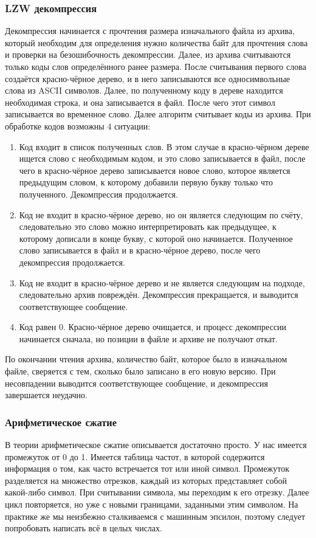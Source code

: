 \documentclass[12pt]{article}
\begin{document}
\subsubsection*{LZW декомпрессия}

Декомпрессия начинается с прочтения размера изначального файла из архива, который необходим для определения нужно количества байт для прочтения слова и проверки на безошибочность декомпрессии. Далее, из архива считываются только коды слов определённого ранее размера. После считывания первого слова создаётся красно-чёрное дерево, и в него записываются все односимвольные слова из ASCII символов. Далее, по полученному коду в дереве находится необходимая строка, и она записывается в файл. После чего этот символ записывается во временное слово. Далее алгоритм считывает коды из архива. При обработке кодов возможны 4 ситуации:

\begin{enumerate}
	\item Код входит в список полученных слов. В этом случае в красно-чёрном дереве ищется слово с необходимым кодом, и это слово записывается в файл, после чего в красно-чёрное дерево записывается новое слово, которое является предыдущим словом, к которому добавили первую букву только что полученного. Декомпрессия продолжается.
	\item Код не входит в красно-чёрное дерево, но он является следующим по счёту, следовательно это слово можно интерпретировать как предыдущее, к которому дописали в конце букву, с которой оно начинается. Полученное слово записывается в файл и в красно-чёрное дерево, после чего декомпрессия продолжается.
	\item Код не входит в красно-чёрное дерево и не является следующим на подходе, следовательно архив повреждён. Декомпрессия прекращается, и выводится соответствующее сообщение.
	\item Код равен $0$. Красно-чёрное дерево очищается, и процесс декомпрессии начинается сначала, но позиции в файле и архиве не получают откат.
\end{enumerate}

По окончании чтения архива, количество байт, которое было в изначальном файле, сверяется с тем, сколько было записано в его новую версию. При несовпадении выводится соответствующее сообщение, и декомпрессия завершается неудачно.

\subsubsection*{Арифметическое сжатие}
В теории арифметическое сжатие описывается достаточно просто. У нас имеется промежуток от 0 до 1. Имеется таблица частот, в которой содержится информация о том, как часто встречается тот или иной символ. Промежуток разделяется на множество отрезков, каждый из которых представляет собой какой-либо символ. При считывании символа, мы переходим к его отрезку. Далее цикл повторяется, но уже с новыми границами, заданными этим символом. На практике же мы неизбежно сталкиваемся с машинным эпсилон, поэтому следует попробовать написать всё в целых числах.
\end{document}

